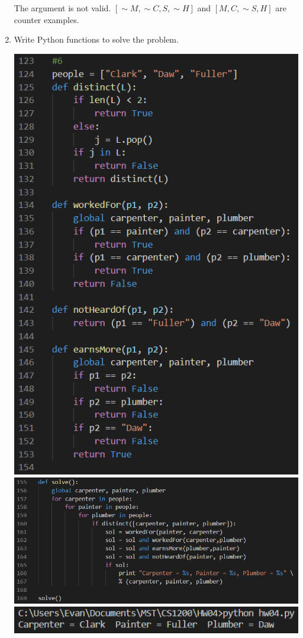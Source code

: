 \documentclass{article}
\begin{document}
\begin{enumerate}
    \vspace{10px}

    The argument is not valid. $[\sim M, \sim C, S, \sim H]$ and $[M, C, \sim S, H]$ are counter examples.

    \newpage
    \item Write Python functions to solve the problem.

    \includegraphics[scale=.7]{6a}\\
    \includegraphics[scale=.7]{6b}\\
    \includegraphics[scale=.8]{6c}


\end{enumerate}
\end{document}
